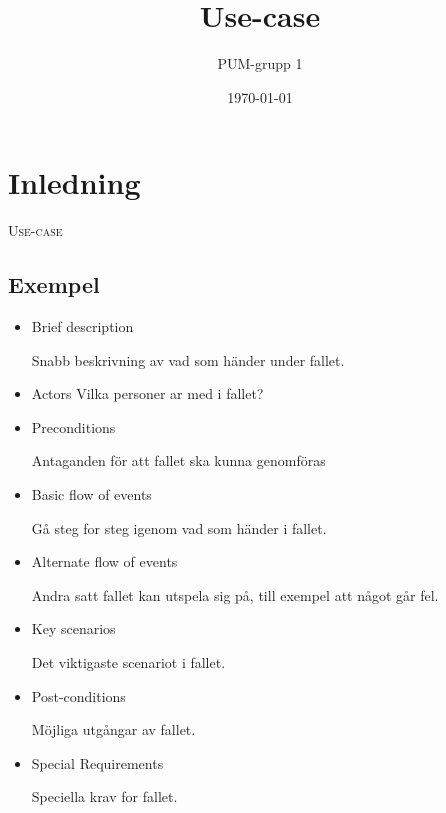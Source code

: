 

\ifpdf
\else
\fi

\title{Use-case}
\author{PUM-grupp 1}
\date{\today}



\maketitle\thispagestyle{empty}

\newpage

\section{Inledning}
\textsc{\LARGE Use-case}

\subsection{Exempel}
\begin{itemize}
	\item Brief description
	
	Snabb beskrivning av vad som händer under fallet.
	\item Actors
	Vilka personer ar med i fallet?
	
	\item Preconditions
	
	Antaganden för att fallet ska kunna genomföras
	\item Basic flow of events
	
	Gå steg for steg igenom vad som händer i fallet.
	\item Alternate flow of events
	
	Andra satt fallet kan utspela sig på, till exempel att något går fel.
	\item Key scenarios
	
	Det viktigaste scenariot i fallet.
	\item Post-conditions
	
	Möjliga utgångar av fallet.
	\item Special Requirements
	
	Speciella krav for fallet.
\end{itemize}


